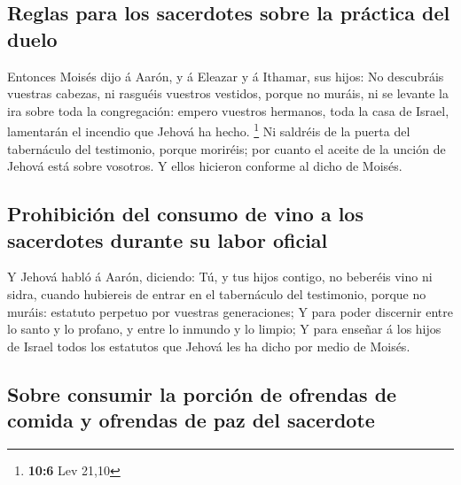 \hypertarget{reglas-para-los-sacerdotes-sobre-la-pruxe1ctica-del-duelo}{%
\subsection{Reglas para los sacerdotes sobre la práctica del
duelo}\label{reglas-para-los-sacerdotes-sobre-la-pruxe1ctica-del-duelo}}

 Entonces Moisés dijo á Aarón, y á Eleazar y á Ithamar, sus
hijos: No descubráis vuestras cabezas, ni rasguéis vuestros vestidos,
porque no muráis, ni se levante la ira sobre toda la congregación:
empero vuestros hermanos, toda la casa de Israel, lamentarán el incendio
que Jehová ha hecho. \footnote{\textbf{10:6} Lev 21,10}  Ni
saldréis de la puerta del tabernáculo del testimonio, porque moriréis;
por cuanto el aceite de la unción de Jehová está sobre vosotros. Y ellos
hicieron conforme al dicho de Moisés.

\hypertarget{prohibiciuxf3n-del-consumo-de-vino-a-los-sacerdotes-durante-su-labor-oficial}{%
\subsection{Prohibición del consumo de vino a los sacerdotes durante su
labor
oficial}\label{prohibiciuxf3n-del-consumo-de-vino-a-los-sacerdotes-durante-su-labor-oficial}}

 Y Jehová habló á Aarón, diciendo:  Tú, y tus
hijos contigo, no beberéis vino ni sidra, cuando hubiereis de entrar en
el tabernáculo del testimonio, porque no muráis: estatuto perpetuo por
vuestras generaciones;  Y para poder discernir entre lo
santo y lo profano, y entre lo inmundo y lo limpio;  Y para
enseñar á los hijos de Israel todos los estatutos que Jehová les ha
dicho por medio de Moisés.

\hypertarget{sobre-consumir-la-porciuxf3n-de-ofrendas-de-comida-y-ofrendas-de-paz-del-sacerdote}{%
\subsection{Sobre consumir la porción de ofrendas de comida y ofrendas
de paz del
sacerdote}\label{sobre-consumir-la-porciuxf3n-de-ofrendas-de-comida-y-ofrendas-de-paz-del-sacerdote}}

